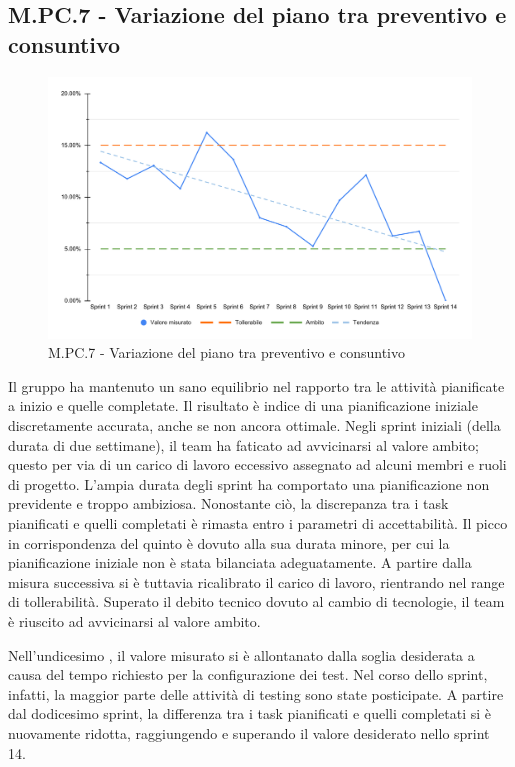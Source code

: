 \subsection{M.PC.7 - Variazione del piano tra preventivo e consuntivo}
\begin{figure}[H]
    \centering
    \includegraphics[width=\textwidth]{assets/variazione_task_completati.pdf}
    \caption{M.PC.7 - Variazione del piano tra preventivo e consuntivo}
\end{figure}

\par Il gruppo ha mantenuto un sano equilibrio nel rapporto tra le attività pianificate a inizio  e quelle completate. Il risultato è indice di una pianificazione iniziale discretamente accurata, anche se non ancora ottimale. Negli sprint iniziali (della durata di due settimane), il team ha faticato ad avvicinarsi al valore ambito; questo per via di un carico di lavoro eccessivo assegnato ad alcuni membri e ruoli di progetto. L'ampia durata degli sprint ha comportato una pianificazione non previdente e troppo ambiziosa. Nonostante ciò, la discrepanza tra i task pianificati e quelli completati è rimasta entro i parametri di accettabilità. Il picco in corrispondenza del quinto  è dovuto alla sua durata minore, per cui la pianificazione iniziale non è stata bilanciata adeguatamente. A partire dalla misura successiva si è tuttavia ricalibrato il carico di lavoro, rientrando nel range di tollerabilità. Superato il debito tecnico dovuto al cambio di tecnologie, il team è riuscito ad avvicinarsi al valore ambito.

\par Nell'undicesimo , il valore misurato si è allontanato dalla soglia desiderata a causa del tempo richiesto per la configurazione dei test. Nel corso dello sprint, infatti, la maggior parte delle attività di testing  sono state posticipate. A partire dal dodicesimo sprint, la differenza tra i task pianificati e quelli completati si è nuovamente ridotta, raggiungendo e superando il valore desiderato nello sprint 14.
